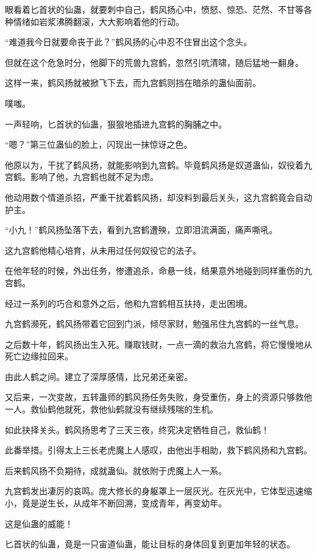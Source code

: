
\begin{this_body}

眼看着匕首状的仙蛊，就要刺中自己，鹤风扬心中，愤怒、惊恐、茫然、不甘等各种情绪如岩浆沸腾翻滚，大大影响着他的行动。

“难道我今日就要命丧于此？”鹤风扬的心中忍不住冒出这个念头。

但就在这个危急时分，他脚下的荒兽九宫鹤，忽然引吭清啸，随后猛地一翻身。

这样一来，鹤风扬就被掀飞下去，而九宫鹤则挡在暗杀的蛊仙面前。

噗嗤。

一声轻响，匕首状的仙蛊，狠狠地插进九宫鹤的胸脯之中。

“嗯？”第三位蛊仙的脸上，闪现出一抹惊讶之色。

他原以为，干扰了鹤风扬，就能影响到九宫鹤。毕竟鹤风扬是奴道蛊仙，奴役着九宫鹤。影响了他，九宫鹤也就不足为虑。

他动用数个情道杀招，严重干扰着鹤风扬，却没料到最后关头，这九宫鹤竟会自动护主。

“小九！”鹤风扬坠落下去，看到九宫鹤遭殃，立即泪流满面，痛声嘶吼。

这九宫鹤他精心培育，从未用过任何奴役它的法子。

在他年轻的时候，外出任务，惨遭追杀，命悬一线，结果意外地碰到同样重伤的九宫鹤。

经过一系列的巧合和意外之后，他和九宫鹤相互扶持，走出困境。

九宫鹤濒死，鹤风扬带着它回到门派，倾尽家财，勉强吊住九宫鹤的一丝气息。

之后数十年，鹤风扬出生入死。赚取钱财，一点一滴的救治九宫鹤，将它慢慢地从死亡边缘拉回来。

由此人鹤之间。建立了深厚感情，比兄弟还亲密。

又后来，一次变故，五转蛊师的鹤风扬任务失败，身受重伤，身上的资源只够救他一人。救仙鹤他就死，救他仙鹤就没有继续残喘的生机。

如此抉择关头。鹤风扬思考了三天三夜，终究决定牺牲自己，救仙鹤！

此番举措。引得太上三长老虎魔上人感叹，由他出手相助，救下鹤风扬和九宫鹤。

后来鹤风扬不负期待，成就蛊仙。就依附于虎魔上人一系。

九宫鹤发出凄厉的哀鸣。庞大修长的身躯罩上一层灰光。在灰光中，它体型迅速缩小，竟是逆生长，从成年不断回溯，变成青年，再变幼年。

这是仙蛊的威能！

匕首状的仙蛊，竟是一只宙道仙蛊，能让目标的身体回复到更加年轻的状态。


\end{this_body}
